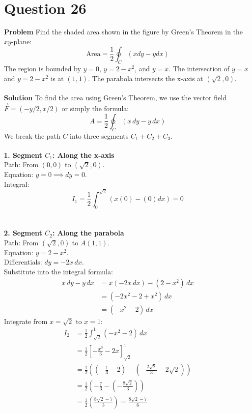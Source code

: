 \documentclass{article}
\begin{document}
\pagebreak


\section{Question 26}
\textbf{Problem}
Find the shaded area shown in the figure by Green's Theorem in the $xy$-plane:
\[
	\text{Area} = \frac{1}{2} \oint_C (x dy - y dx)
\]
The region is bounded by $y=0$, $y=2-x^2$, and $y=x$. The intersection of $y=x$
and $y=2-x^2$ is at $(1,1)$. The parabola intersects the x-axis at
$(\sqrt{2}, 0)$.
\\
\\
\textbf{Solution}
To find the area using Green's Theorem, we use the vector field
$\vec{F} = (-y/2, x/2)$ or simply the formula:
\[
	A = \frac{1}{2} \oint_C (x \, dy - y \, dx)
\]
We break the path $C$ into three segments $C_1 + C_2 + C_3$.
\\
\\
\textbf{1. Segment $C_1$: Along the x-axis}
\\
Path: From $(0,0)$ to $(\sqrt{2}, 0)$.
\\
Equation: $y=0 \implies dy=0$.
\\
Integral:
\[
	I_1 = \frac{1}{2} \int_0^{\sqrt{2}} (x(0) - (0)dx) = 0
\]
\\
\\
\textbf{2. Segment $C_2$: Along the parabola}
\\
Path: From $(\sqrt{2}, 0)$ to $A(1,1)$.
\\
Equation: $y = 2 - x^2$.
\\
Differentials: $dy = -2x \, dx$.
\\
Substitute into the integral formula:
\begin{align*}
	x \, dy - y \, dx & = x(-2x \, dx) - (2 - x^2) \, dx \\
	                  & = (-2x^2 - 2 + x^2) \, dx        \\
	                  & = (-x^2 - 2) \, dx
\end{align*}
Integrate from $x=\sqrt{2}$ to $x=1$:
\begin{align*}
	I_2 & = \frac{1}{2} \int_{\sqrt{2}}^1 (-x^2 - 2) \, dx                                                           \\
	    & = \frac{1}{2} \left[ -\frac{x^3}{3} - 2x \right]_{\sqrt{2}}^1                                              \\
	    & = \frac{1}{2} \left( \left(-\frac{1}{3} - 2\right) - \left(-\frac{2\sqrt{2}}{3} - 2\sqrt{2}\right) \right) \\
	    & = \frac{1}{2} \left( -\frac{7}{3} - \left( -\frac{8\sqrt{2}}{3} \right) \right)                            \\
	    & = \frac{1}{2} \left( \frac{8\sqrt{2} - 7}{3} \right) = \frac{8\sqrt{2} - 7}{6}
\end{align*}
\end{document}
